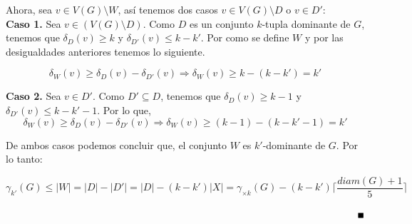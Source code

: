 \documentclass{article}
\begin{document}

Ahora, sea $v \in V(G)\setminus W$, así tenemos dos casos $v \in V(G)\setminus D$ o $v \in D'$:\\

\textbf{Caso 1.} Sea $v \in (V(G)\setminus D)$. Como $D$ es un conjunto $k$-tupla dominante de $G$, tenemos que $\delta_{D}(v) \geq k$ y $\delta_{D'}(v) \leq k-k'$. Por como se define $W$ y por las desigualdades anteriores tenemos lo siguiente.
	
$$\delta_{W}(v) \geq \delta_{D}(v) - \delta_{D'}(v) \Longrightarrow \delta_{W}(v)\geq k-(k-k')=k'$$

\textbf{Caso 2.} Sea $v \in D'$. Como $D'\subseteq D$, tenemos que $\delta_{D}(v) \geq k-1$ y $\delta_{D'}(v) \leq k-k' - 1$. Por lo que, 
$$\delta_{W}(v) \geq \delta_{D}(v)- \delta_{D'}(v) \Longrightarrow \delta_{W}(v) \geq (k-1)-(k-k'-1)=k'$$

De ambos casos podemos concluir que, el conjunto $W$ es $k'$-dominante de $G$. Por lo tanto:

$$\gamma_{k'}(G)\le |W|=|D|-|D'|=|D|-(k-k')|X|=\gamma_{\times k}(G) - (k-k')\Big\lceil \frac{diam(G) + 1}{5} \Big\rceil$$

$\hspace{15.5cm}\blacksquare$\\
\end{document}
